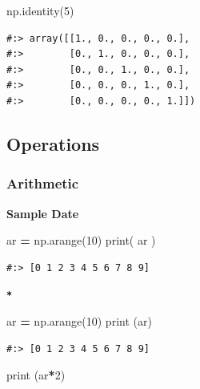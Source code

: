 \documentclass[
]{book}
\newenvironment{Shaded}{\begin{snugshade}}{\end{snugshade}}
\newcommand{\BuiltInTok}[1]{#1}
\newcommand{\DecValTok}[1]{\textcolor[rgb]{0.06,0.06,0.06}{#1}}
\newcommand{\NormalTok}[1]{#1}
\newcommand{\OperatorTok}[1]{\textcolor[rgb]{0.43,0.43,0.43}{\textbf{#1}}}
\begin{document}
\begin{Shaded}
\begin{Highlighting}[]
\NormalTok{np.identity(}\DecValTok{5}\NormalTok{)}
\end{Highlighting}
\end{Shaded}

\begin{verbatim}
#:> array([[1., 0., 0., 0., 0.],
#:>        [0., 1., 0., 0., 0.],
#:>        [0., 0., 1., 0., 0.],
#:>        [0., 0., 0., 1., 0.],
#:>        [0., 0., 0., 0., 1.]])
\end{verbatim}

\hypertarget{operations}{%
\subsection{Operations}\label{operations}}

\hypertarget{arithmetic}{%
\subsubsection{Arithmetic}\label{arithmetic}}

\textbf{Sample Date}

\begin{Shaded}
\begin{Highlighting}[]
\NormalTok{ar }\OperatorTok{=}\NormalTok{ np.arange(}\DecValTok{10}\NormalTok{)}
\BuiltInTok{print}\NormalTok{( ar )}
\end{Highlighting}
\end{Shaded}

\begin{verbatim}
#:> [0 1 2 3 4 5 6 7 8 9]
\end{verbatim}

\textbf{\texttt{*}}

\begin{Shaded}
\begin{Highlighting}[]
\NormalTok{ar }\OperatorTok{=}\NormalTok{ np.arange(}\DecValTok{10}\NormalTok{)}
\BuiltInTok{print}\NormalTok{ (ar)}
\end{Highlighting}
\end{Shaded}

\begin{verbatim}
#:> [0 1 2 3 4 5 6 7 8 9]
\end{verbatim}

\begin{Shaded}
\begin{Highlighting}[]
\BuiltInTok{print}\NormalTok{ (ar}\OperatorTok{*}\DecValTok{2}\NormalTok{)}
\end{Highlighting}
\end{Shaded}
\end{document}
